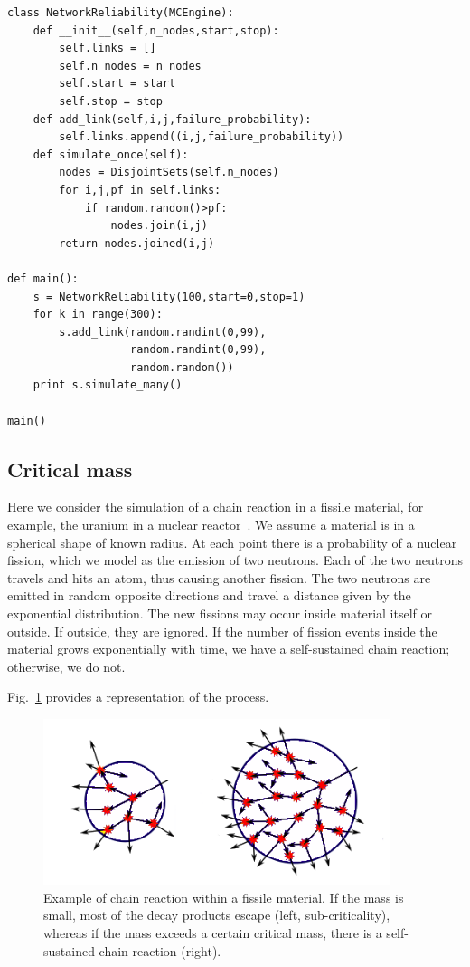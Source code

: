 \documentclass[justified,sixbynine]{tufte-book}
\def\ft{\small\tt}
\theoremstyle{plain}%
\theoremstyle{definition}
\theoremstyle{remark}
\begin{document}
\begin{fullwidth}
\begin{lstlisting}[caption={in file: {\ft network.py}}]
class NetworkReliability(MCEngine):
    def __init__(self,n_nodes,start,stop):
        self.links = []
        self.n_nodes = n_nodes
        self.start = start
        self.stop = stop
    def add_link(self,i,j,failure_probability):
        self.links.append((i,j,failure_probability))
    def simulate_once(self):
        nodes = DisjointSets(self.n_nodes)
        for i,j,pf in self.links:
            if random.random()>pf:
                nodes.join(i,j)
        return nodes.joined(i,j)

def main():
    s = NetworkReliability(100,start=0,stop=1)
    for k in range(300):
        s.add_link(random.randint(0,99),
                   random.randint(0,99),
                   random.random())
    print s.simulate_many()

main()
\end{lstlisting}

\subsection{Critical mass}

Here we consider the simulation of a chain reaction in a fissile material, for example, the uranium in a nuclear reactor~\cite{neutron}. We assume a material is in a spherical shape of known radius. At each point there is a probability of a nuclear fission, which we model as the emission of two neutrons. Each of the two neutrons travels and hits an atom, thus causing another fission. The two neutrons are emitted in random opposite directions and travel a distance given by the exponential distribution. The new fissions may occur inside material itself or outside. If outside, they are ignored. If the number of fission events inside the material grows exponentially with time, we have a self-sustained chain reaction; otherwise, we do not.

Fig.~\ref{nuclear} provides a representation of the process.

\begin{figure}[ht]
\centering\includegraphics[width=4in]{images/critical.png}
\caption{Example of chain reaction within a fissile material. If the mass is small, most of the decay products escape (left, sub-criticality), whereas if the mass exceeds a certain critical mass, there is a self-sustained chain reaction (right).\label{nuclear}}
\end{figure}


\end{fullwidth}
\end{document}
